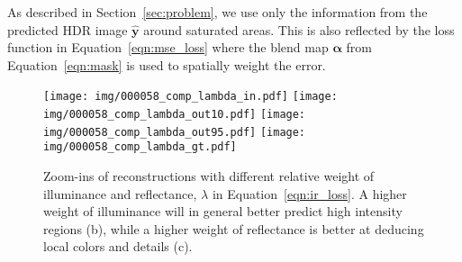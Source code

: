\documentclass[acmtog]{acmart}
\newcommand{\eqnref}[1]{Equation~\ref{eqn:#1}}
\newcommand{\secref}[1]{Section~\ref{sec:#1}}
\newcommand{\vect}[1]{\boldsymbol{#1}}
\newcommand{\yp}{\hat{y}}
\newcommand{\y}{\vect{\yp}}
\newcommand{\msk}{\alpha}
\newcommand\belowfigspace{-2pt}
\begin{document}
As described in \secref{problem}, we use only the information from the predicted HDR image $\y$ around saturated areas. This is also reflected by the loss function in \eqnref{mse_loss} where the blend map $\vect{\msk}$ from \eqnref{mask} is used to spatially weight the error.

\begin{figure}[t]
	\vspace{5pt}
	\newcommand\ww{0.116}
	\centering
	\texttt{[image: img/000058\_comp\_lambda\_in.pdf]}
	\texttt{[image: img/000058\_comp\_lambda\_out10.pdf]}
	\texttt{[image: img/000058\_comp\_lambda\_out95.pdf]}
	\texttt{[image: img/000058\_comp\_lambda\_gt.pdf]}\\
	\vspace{-2pt}
	\vspace{-10pt}
	\caption{\label{fig:lambda} Zoom-ins of reconstructions with different relative weight of illuminance and reflectance, $\lambda$ in \eqnref{ir_loss}. A higher weight of illuminance will in general better predict high intensity regions (b), while a higher weight of reflectance is better at deducing local colors and details (c).}
	\vspace{\belowfigspace}
\end{figure}
\end{document}
